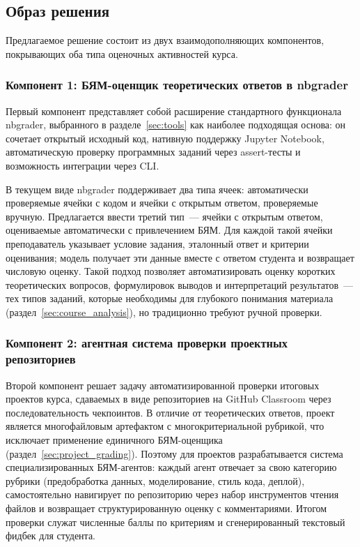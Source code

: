 \subsection{Образ решения}

Предлагаемое решение состоит из двух взаимодополняющих компонентов,
покрывающих оба типа оценочных активностей курса.

\subsubsection*{Компонент 1: БЯМ-оценщик теоретических ответов в nbgrader}

Первый компонент представляет собой расширение стандартного функционала
nbgrader, выбранного в разделе~\ref{sec:tools} как наиболее подходящая
основа: он сочетает открытый исходный код, нативную поддержку
Jupyter Notebook, автоматическую проверку программных заданий через
assert-тесты и возможность интеграции через CLI.

В текущем виде nbgrader поддерживает два типа ячеек: автоматически
проверяемые ячейки с кодом и ячейки с открытым ответом, проверяемые
вручную. Предлагается ввести третий тип~--- ячейки с открытым ответом,
оцениваемые автоматически с привлечением БЯМ. Для каждой такой ячейки
преподаватель указывает условие задания, эталонный ответ и критерии
оценивания; модель получает эти данные вместе с ответом студента и
возвращает числовую оценку. Такой
подход позволяет автоматизировать оценку коротких теоретических
вопросов, формулировок выводов и интерпретаций результатов~--- тех
типов заданий, которые необходимы для глубокого понимания материала
(раздел~\ref{sec:course_analysis}), но традиционно требуют ручной
проверки.

\subsubsection*{Компонент 2: агентная система проверки проектных репозиториев}

Второй компонент решает задачу автоматизированной проверки итоговых
проектов курса, сдаваемых в виде репозиториев на GitHub Classroom через
последовательность чекпоинтов. В отличие от теоретических ответов, проект
является многофайловым артефактом с многокритериальной рубрикой, что
исключает применение единичного БЯМ-оценщика
(раздел~\ref{sec:project_grading}). Поэтому для проектов разрабатывается
система специализированных БЯМ-агентов: каждый агент отвечает за свою
категорию рубрики (предобработка данных, моделирование, стиль кода,
деплой), самостоятельно навигирует по репозиторию через набор инструментов
чтения файлов и возвращает структурированную оценку с комментариями.
Итогом проверки служат численные баллы по критериям и сгенерированный
текстовый фидбек для студента.

